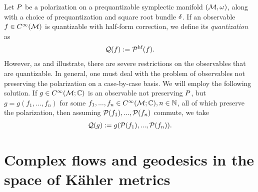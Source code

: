 \documentclass[notas.tex]{subfiles}
\begin{document}
\begin{rem} \label{rem_full_quantization}
	Let $P$ be a polarization on a prequantizable symplectic manifold $(\mathcal{M}, \omega)$, along with a choice of prequantization and square root bundle $\delta$. If an observable $f \in C^\infty(\mathcal{M})$ is quantizable with half-form correction, we define its \emph{quantization} as 
	\begin{align*}
		\mathcal{Q}(f) := \mathcal{\mathcal{P}^\text{hf}}(f).
	\end{align*}
	However, as  and  illustrate, there are severe restrictions on the observables that are quantizable. In general, one must deal with the problem of observables not preserving the polarization on a case-by-case basis. We will employ the following solution. If $g \in C^\infty(\mathcal{M}; \mathbb{C})$ is an observable not preserving $P$, but $g = g(f_1,...,f_n)$ for some $f_1,...,f_n \in C^\infty(\mathcal{M}; \mathbb{C}), n \in \mathbb{N}$, all of which preserve the polarization, then assuming $\mathcal{P}(f_1),...,\mathcal{P}(f_n)$ commute, we take 
	\begin{align} \label{eq_quant_nopol}
		\mathcal{Q}(g) := g(\mathcal{P}(f_1),...,\mathcal{P}(f_n)).
	\end{align}
\end{rem}


\section{Complex flows and geodesics in the space of Kähler metrics} \label{sec_complex_flows}
\end{document}
